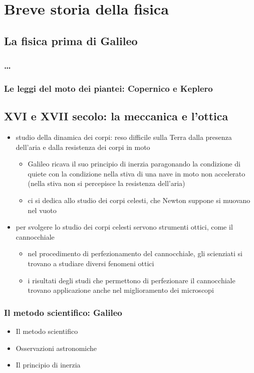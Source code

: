 \chapter{Breve storia della fisica}
\section{La fisica prima di Galileo}
\subsection{\dots}
\subsection{Le leggi del moto dei piantei: Copernico e Keplero}

\section{XVI e XVII secolo: la meccanica e l'ottica}
\begin{itemize}
  \item studio della dinamica dei corpi: reso difficile sulla Terra dalla presenza dell'aria e dalla resistenza dei corpi in moto
  \begin{itemize}
    \item Galileo ricava il suo principio di inerzia paragonando la condizione di quiete con la condizione nella stiva di una nave in moto non accelerato (nella stiva non si percepisce la resistenza dell'aria)
    \item ci si dedica allo studio dei corpi celesti, che Newton suppone si muovano nel vuoto
  \end{itemize}
  \item per svolgere lo studio dei corpi celesti servono strumenti ottici, come il cannocchiale
  \begin{itemize}
    \item nel procedimento di perfezionamento del cannocchiale, gli scienziati si trovano a studiare diversi fenomeni ottici
    \item i risultati degli studi che permettono di perfezionare il cannocchiale trovano applicazione anche nel miglioramento dei microscopi
  \end{itemize}
\end{itemize}
\subsection{Il metodo scientifico: Galileo}
\begin{itemize}
  \item Il metodo scientifico
  \item Osservazioni astronomiche
  \item Il principio di inerzia
\end{itemize}
